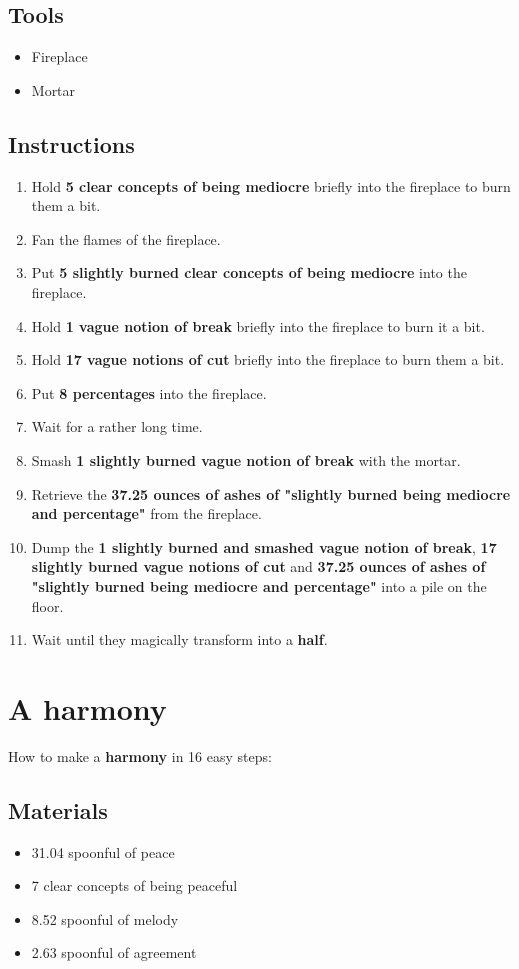 \documentclass{article}
\begin{document}
\subsection{Tools}\begin{itemize}
\item 
Fireplace
\item 
Mortar
\end{itemize}
\subsection{Instructions}\begin{enumerate}
\item 
Hold \textbf{5 clear concepts of being mediocre} briefly into the fireplace to burn them a bit.
\item 
Fan the flames of the fireplace.
\item 
Put \textbf{5 slightly burned clear concepts of being mediocre} into the fireplace.
\item 
Hold \textbf{1 vague notion of break} briefly into the fireplace to burn it a bit.
\item 
Hold \textbf{17 vague notions of cut} briefly into the fireplace to burn them a bit.
\item 
Put \textbf{8 percentages} into the fireplace.
\item 
Wait for a rather long time.
\item 
Smash \textbf{1 slightly burned vague notion of break} with the mortar.
\item 
Retrieve the \textbf{37.25 ounces of ashes of "slightly burned being mediocre and percentage"} from the fireplace.
\item 
Dump the \textbf{1 slightly burned and smashed vague notion of break}, \textbf{17 slightly burned vague notions of cut} and \textbf{37.25 ounces of ashes of "slightly burned being mediocre and percentage"} into a pile on the floor.
\item 
Wait until they magically transform into a \textbf{half}.
\end{enumerate}
\newpage
\section{A harmony}How to make a \textbf{harmony} in 16 easy steps:

\subsection{Materials}\begin{itemize}
\item 
31.04 spoonful of peace
\item 
7 clear concepts of being peaceful
\item 
8.52 spoonful of melody
\item 
2.63 spoonful of agreement
\end{itemize}
\end{document}
